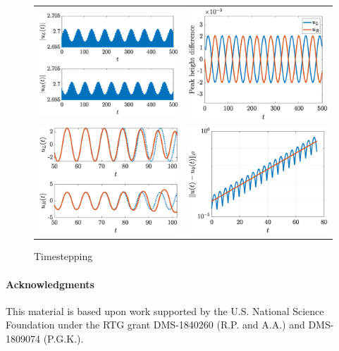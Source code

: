 \documentclass[12pt,reqno]{amsart}
\begin{document}
\begin{figure}
	\begin{center}
	\begin{tabular}{cc}
	\includegraphics[width=7.5cm]{timestepN6.eps} &
	\includegraphics[width=7.5cm]{timestepN6pks.eps} \\ 
	\includegraphics[width=7.5cm]{timestepN6pp.eps} &
	\includegraphics[width=7.5cm]{timestepN6growth.eps}
	\end{tabular}
	\end{center}
	\caption{Timestepping}
	\label{fig:timestepSG}
\end{figure}



\paragraph{Acknowledgments}

This material is based upon work supported by the U.S. National Science Foundation under the RTG grant DMS-1840260 (R.P. and A.A.)
and DMS-1809074 (P.G.K.).



\end{document}
